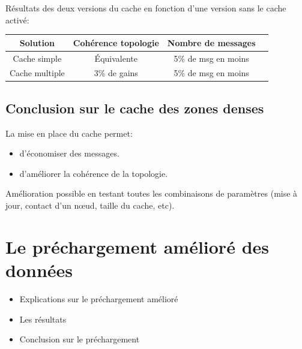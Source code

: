 \documentclass{beamer}
\begin{document}
  \begin{frame}
  	Résultats des deux versions du cache en fonction d'une version sans le cache activé:
	\begin{table}[!h]
  		\begin{center}
    		\begin{tabular}{|c|c|c|c|}
      		\hline
      		Solution & Cohérence topologie & Nombre de messages \\
      		\hline
      		Cache simple & Équivalente &  5\% de msg en moins\\
      		Cache multiple & 3\% de gains &  5\% de msg en moins\\
      		\hline
    		\end{tabular}
  		\end{center}
  		\label{tab:config1}
	\end{table}
	
  \end{frame}
	
  \subsection{Conclusion sur le cache des zones denses}
  \begin{frame}
  	La mise en place du cache permet:\\
	\begin{itemize}
		\item d'économiser des messages.\\
		\item d'améliorer la cohérence de la topologie.\\
	\end{itemize}
	\vspace{5mm}
	Amélioration possible en testant toutes les combinaisons de paramètres (mise à jour, contact d'un nœud, taille du cache, etc).\\
  \end{frame}



  \section{Le préchargement amélioré des données}
  \begin{frame}
	\vspace{1cm}
	\begin{itemize}
		\item Explications sur le préchargement amélioré
		\item Les résultats 
		\item Conclusion sur le préchargement
	\end{itemize}
  \end{frame}
\end{document}
